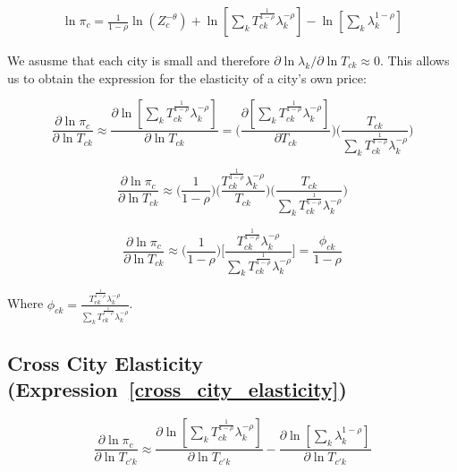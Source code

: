 \documentclass[10pt]{article}
\begin{document}
\begin{align*}
    \ln \pi_c = \frac{1}{1 - \rho} \ln (Z_c^{- \theta}) + \ln [\sum_{k}^{} T_{ck}^{\frac{1}{1 - \rho}} \lambda_k^{- \rho}] - \ln [\sum_{k}^{} \lambda_k^{1 - \rho}]
\end{align*}

We asusme that each city is small and therefore $\partial \ln \lambda_k / \partial \ln T_{ck} \approx 0$. This allows us to obtain the expression for the elasticity of a city's own price:

\begin{equation*}
    \frac{\partial\ln{\pi_{c}}}{\partial\ln{T_{ck}}} \approx \frac{\partial\ln[{\sum\limits_{k}{T^{\frac{1}{1-\rho}}_{ck}}\lambda_{k}^{-\rho}}]}{\partial\ln{T_{ck}}} = \Bigg(\frac{\partial[{\sum\limits_{k}{T^{\frac{1}{1-\rho}}_{ck}}\lambda_{k}^{-\rho}}]}{\partial{T_{ck}}}\Bigg)\Bigg(\frac{T_{ck}}{{\sum\limits_{k}{T^{\frac{1}{1-\rho}}_{ck}}\lambda_{k}^{-\rho}}}\Bigg)
\end{equation*}

\begin{equation*}
    \frac{\partial\ln{\pi_{c}}}{\partial\ln{T_{ck}}} \approx \Bigg(\frac{1}{1-\rho}\Bigg)\Bigg(\frac{T_{ck}^{\frac{1}{1-\rho}}\lambda_{k}^{-\rho}}{T_{ck}}\Bigg)\Bigg(\frac{T_{ck}}{{\sum\limits_{k}{T^{\frac{1}{1-\rho}}_{ck}}\lambda_{k}^{-\rho}}}\Bigg)
\end{equation*}

\begin{equation*}
    \frac{\partial\ln{\pi_{c}}}{\partial\ln{T_{ck}}} \approx \Big(\frac{1}{1-\rho}\Big)\Bigg[\frac{{T^{\frac{1}{1-\rho}}_{ck}}\lambda_{k}^{-\rho}}{\sum\limits_{k}{T^{\frac{1}{1-\rho}}_{ck}}\lambda_{k}^{-\rho}}\Bigg] = \frac{\phi_{ck}}{1-\rho}
\end{equation*}

Where $\phi_{ck} = \frac{T_{ck}^{\frac{1}{1-\rho}}\lambda_{k}^{-\rho}}{\sum\limits_{k}{T^{\frac{1}{1-\rho}}_{ck}}\lambda_{k}^{-\rho}}$.

\subsection{Cross City Elasticity (Expression~\ref{cross_city_elasticity})}

\begin{equation*}
    \frac{\partial\ln{\pi_{c}}}{\partial\ln{T_{{c'}k}}} \approx \frac{\partial\ln[{\sum\limits_{k}{T^{\frac{1}{1-\rho}}_{ck}}\lambda_{k}^{-\rho}}]}{\partial\ln{T_{{c'}k}}} - \frac{\partial\ln[{\sum\limits_{k}\lambda_{k}^{1-\rho}}]}{\partial\ln{T_{{c'}k}}}
\end{equation*}
\end{document}
